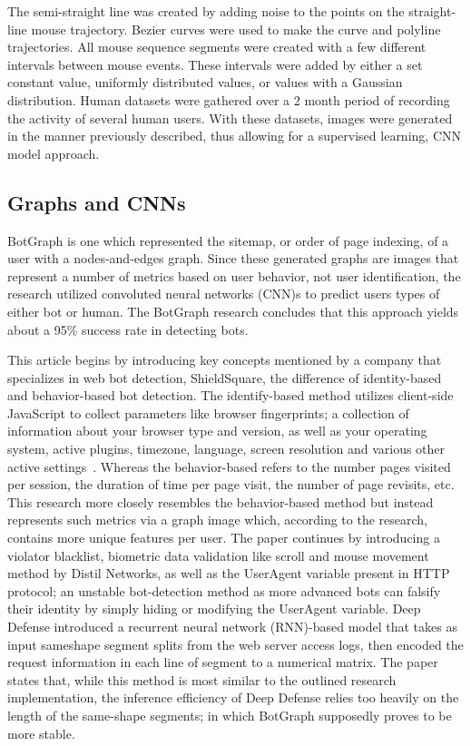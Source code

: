 The semi-straight line was created by adding noise to the points on the straight-line mouse trajectory.
Bezier curves were used to make the curve and polyline trajectories.
All mouse sequence segments were created with a few different intervals between mouse events.
These intervals were added by either a set constant value, uniformly distributed values, or values with a Gaussian distribution.
Human datasets were gathered over a 2 month period of recording the activity of several human users.
With these datasets, images were generated in the manner previously described, thus allowing for a supervised learning, CNN model approach.

\subsection{Graphs and CNNs}\label{subsec:graphs-and-cnns}
BotGraph is one which represented the sitemap, or order of page indexing, of a user with a nodes-and-edges graph.
Since these generated graphs are images that represent a number of metrics based on user behavior, not user identification, the research utilized convoluted neural networks (CNN)s to predict users types of either bot or human.
The BotGraph research concludes that this approach yields about a 95\% success rate in detecting bots.

This article begins by introducing key concepts mentioned by a company that specializes in web bot detection, ShieldSquare, the difference of identity-based and behavior-based bot detection.
The identify-based method utilizes client-side JavaScript to collect parameters like browser fingerprints; a collection of information about your browser type and version, as well as your operating system, active plugins, timezone, language, screen resolution and various other active settings~\cite{browser_fingerprinting}.
Whereas the behavior-based refers to the number pages visited per session, the duration of time per page visit, the number of page revisits, etc.
This research more closely resembles the behavior-based method but instead represents such metrics via a graph image which, according to the research, contains more unique features per user.
The paper continues by introducing a violator blacklist, biometric data validation like scroll and mouse movement method by Distil Networks, as well as the UserAgent variable present in HTTP protocol; an unstable bot-detection method as more advanced bots can falsify their identity by simply hiding or modifying the UserAgent variable.
Deep Defense introduced a recurrent neural network (RNN)-based model that takes as input sameshape segment splits from the web server access logs, then encoded the request information in each line of segment to a numerical matrix.
The paper states that, while this method is most similar to the outlined research implementation, the inference efficiency of Deep Defense relies too heavily on the length of the same-shape segments; in which BotGraph supposedly proves to be more stable.

